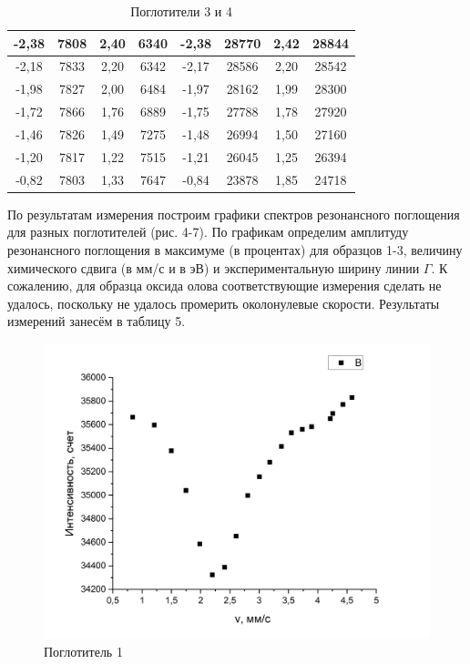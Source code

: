 \documentclass[a4paper, 12pt]{article}
\begin{document}
\begin{table}[h]
\begin{tabular}{|c|c|c|c|c|c|c|c|}
-2,38         & 7808          & 2,40          & 6340          & -2,38         & 28770         & 2,42         & 28844        \\ \hline
-2,18         & 7833          & 2,20          & 6342          & -2,17         & 28586         & 2,20         & 28542        \\ \hline
-1,98         & 7827          & 2,00          & 6484          & -1,97         & 28162         & 1,99         & 28300        \\ \hline
-1,72         & 7866          & 1,76          & 6889          & -1,75         & 27788         & 1,78         & 27920        \\ \hline
-1,46         & 7826          & 1,49          & 7275          & -1,48         & 26994         & 1,50         & 27160        \\ \hline
-1,20         & 7817          & 1,22          & 7515          & -1,21         & 26045         & 1,25         & 26394        \\ \hline
-0,82         & 7803          & 1,33          & 7647          & -0,84         & 23878         & 1,85         & 24718        \\ \hline
\end{tabular}
\centering
\caption{Поглотители 3 и 4}
\end{table}

По результатам измерения построим графики спектров резонансного поглощения для разных поглотителей (рис. 4-7). По графикам определим амплитуду резонансного поглощения в максимуме (в процентах) для образцов 1-3, величину химического сдвига (в мм/с и в эВ) и экспериментальную ширину линии $\Gamma$. К сожалению, для образца оксида олова соответствующие измерения сделать не удалось, поскольку не удалось промерить околонулевые скорости. Результаты измерений занесём в таблицу 5. 

\begin{figure}[h!]
\begin{center}
\includegraphics[scale=0.5]{4} 
\caption{Поглотитель 1}
\end{center}
\end{figure}
\end{document}
